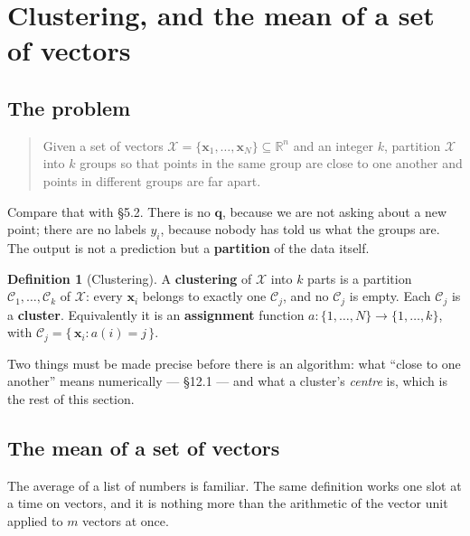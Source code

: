 \documentclass[11pt]{article}
\theoremstyle{plain}
\theoremstyle{definition}
\newtheorem{defn}{Definition}[section]
\theoremstyle{remark}
\newcommand{\R}{\mathbb{R}}
\newcommand{\vc}[1]{\mathbf{#1}}
\newcommand{\X}{\mathcal{X}}
\newcommand{\Cl}{\mathcal{C}}
\begin{document}
\section{Clustering, and the mean of a set of vectors}
\subsection{The problem}
\begin{quote}
Given a set of vectors $\X=\{\vc{x}_1,\dots,\vc{x}_N\}\subseteq\R^{n}$ and an
integer $k$, partition $\X$ into $k$ groups so that points in the same group are
close to one another and points in different groups are far apart.
\end{quote}

\noindent Compare that with \S5.2. There is no $\vc{q}$, because we are not
asking about a new point; there are no labels $y_i$, because nobody has told us
what the groups are. The output is not a prediction but a \textbf{partition} of
the data itself.

\begin{defn}[Clustering]
A \textbf{clustering} of $\X$ into $k$ parts is a partition
$\Cl_1,\dots,\Cl_k$ of $\X$: every $\vc{x}_i$ belongs to exactly one $\Cl_j$,
and no $\Cl_j$ is empty. Each $\Cl_j$ is a \textbf{cluster}. Equivalently it is
an \textbf{assignment} function $a:\{1,\dots,N\}\to\{1,\dots,k\}$, with
$\Cl_j = \{\,\vc{x}_i : a(i)=j\,\}$.
\end{defn}

\noindent Two things must be made precise before there is an algorithm: what
``close to one another'' means numerically --- \S12.1 --- and what a cluster's
\emph{centre} is, which is the rest of this section.

\subsection{The mean of a set of vectors}
The average of a list of numbers is familiar. The same definition works one slot
at a time on vectors, and it is nothing more than the arithmetic of the vector
unit applied to $m$ vectors at once.
\end{document}
